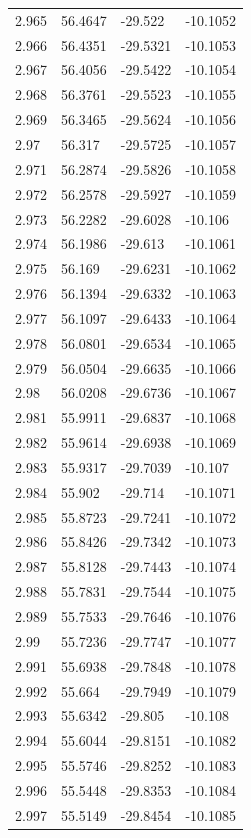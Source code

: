\begin{tabular}{llll}
2.965 & 56.4647 & -29.522 & -10.1052 \\
2.966 & 56.4351 & -29.5321 & -10.1053 \\
2.967 & 56.4056 & -29.5422 & -10.1054 \\
2.968 & 56.3761 & -29.5523 & -10.1055 \\
2.969 & 56.3465 & -29.5624 & -10.1056 \\
2.97 & 56.317 & -29.5725 & -10.1057 \\
2.971 & 56.2874 & -29.5826 & -10.1058 \\
2.972 & 56.2578 & -29.5927 & -10.1059 \\
2.973 & 56.2282 & -29.6028 & -10.106 \\
2.974 & 56.1986 & -29.613 & -10.1061 \\
2.975 & 56.169 & -29.6231 & -10.1062 \\
2.976 & 56.1394 & -29.6332 & -10.1063 \\
2.977 & 56.1097 & -29.6433 & -10.1064 \\
2.978 & 56.0801 & -29.6534 & -10.1065 \\
2.979 & 56.0504 & -29.6635 & -10.1066 \\
2.98 & 56.0208 & -29.6736 & -10.1067 \\
2.981 & 55.9911 & -29.6837 & -10.1068 \\
2.982 & 55.9614 & -29.6938 & -10.1069 \\
2.983 & 55.9317 & -29.7039 & -10.107 \\
2.984 & 55.902 & -29.714 & -10.1071 \\
2.985 & 55.8723 & -29.7241 & -10.1072 \\
2.986 & 55.8426 & -29.7342 & -10.1073 \\
2.987 & 55.8128 & -29.7443 & -10.1074 \\
2.988 & 55.7831 & -29.7544 & -10.1075 \\
2.989 & 55.7533 & -29.7646 & -10.1076 \\
2.99 & 55.7236 & -29.7747 & -10.1077 \\
2.991 & 55.6938 & -29.7848 & -10.1078 \\
2.992 & 55.664 & -29.7949 & -10.1079 \\
2.993 & 55.6342 & -29.805 & -10.108 \\
2.994 & 55.6044 & -29.8151 & -10.1082 \\
2.995 & 55.5746 & -29.8252 & -10.1083 \\
2.996 & 55.5448 & -29.8353 & -10.1084 \\
2.997 & 55.5149 & -29.8454 & -10.1085 \\

\end{tabular}
